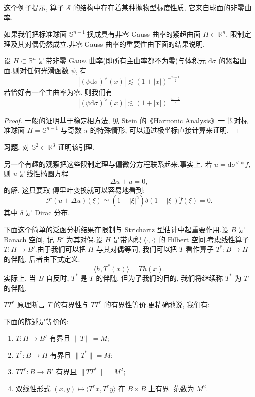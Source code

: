 这个例子提示, 算子 $\mathcal{S}$ 的结构中存在着某种抛物型标度性质, 它来自球面的非零曲率.


如果我们把标准球面 $\mathbb{S}^{n-1}$ 换成具有非零 Gauss 曲率的紧超曲面 $H \subset \mathbb{R}^n$, 限制定理及其对偶仍然成立.非零 Gauss 曲率的重要性由下面的结果说明.

\begin{lemma}\label{lem:c6-8.8}
设 $H \subset \mathbb{R}^n$ 是带非零 Gauss 曲率(即所有主曲率都不为零)与体积元 $\mathrm{d}\sigma$ 的紧超曲面.则对任何光滑函数 $\psi$, 有
\begin{equation}
|(\psi \mathrm{d}\sigma)^\vee (x)| \lesssim (1 + |x|)^{-\frac{n-1}{2}}\label{eq:c6-284}
\end{equation}
若恰好有一个主曲率为零, 则我们有
\[
|(\psi \mathrm{d}\sigma)^\vee (x)| \lesssim (1 + |x|)^{-\frac{n-2}{2}}
\]
\end{lemma}

\begin{proof}
一般的证明基于稳定相方法, 见 Stein 的《Harmonic Analysis》一书.对标准球面 $H = \mathbb{S}^{n-1}$ 与奇数 $n$ 的特殊情形, 可以通过极坐标直接计算来证明.
\end{proof}

\textbf{习题.} 对 $\mathbb{S}^2 \subset \mathbb{R}^3$ 证明该引理.

\begin{remark}\label{rem:c6-8.9}
另一个有趣的观察把这些限制定理与偏微分方程联系起来.事实上, 若 $u = \mathrm{d}\sigma^\vee * f$, 则 $u$ 是线性椭圆方程
\[
\Delta u + u = 0,
\]
的解, 这只要取 傅里叶变换就可以容易地看到:
\[
\mathcal{F}(u + \Delta u)(\xi) \simeq (1 - |\xi|^2) \delta(1 - |\xi|) \hat{f}(\xi) = 0.
\]
其中 $\delta$ 是 Dirac 分布.
\end{remark}


下面这个简单的泛函分析结果在限制与 Strichartz 型估计中起重要作用.设 $B$ 是 Banach 空间, 记 $B'$ 为其对偶.设 $H$ 是带内积 $\langle \cdot, \cdot \rangle$ 的 Hilbert 空间.考虑线性算子 $T: H \to B'$.由于我们可以把 $H$ 与其对偶等同, 我们可以把 $T$ 看作算子 $T^*: B \to H$ 的伴随, 后者由下式定义:
\[
\langle h, T^*(x) \rangle = Th(x).
\]
实际上, 当 $B$ 自反时, $T^*$ 是 $T$ 的伴随, 但为了我们的目的, 我们将继续称 $T^*$ 为 $T$ 的伴随.

$TT^*$ 原理断言 $T$ 的有界性与 $TT^*$ 的有界性等价.更精确地说, 我们有:

\begin{proposition}\label{prop:c6-8.11}
下面的陈述是等价的:
\begin{enumerate}
\renewcommand{\labelenumi}{(\roman{enumi})}
\item $T: H \to B'$ 有界且 $\|T\| = M$;
\item $T^*: B \to H$ 有界且 $\|T^*\| = M$;
\item $TT^*: B \to B'$ 有界且 $\|TT^*\| = M^2$;
\item 双线性形式 $(x, y) \mapsto \langle T^* x, T^* y \rangle$ 在 $B \times B$ 上有界, 范数为 $M^2$.
\end{enumerate}
\end{proposition}

